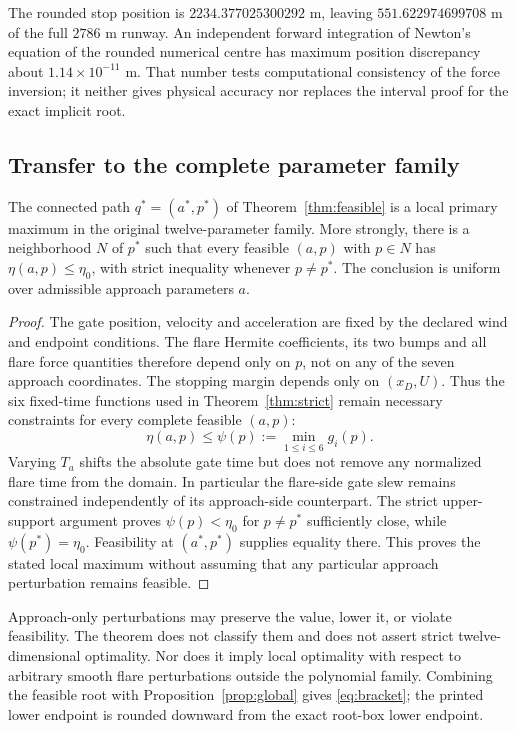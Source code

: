 The rounded stop position is $2234.377025300292$ m, leaving $551.622974699708$ m of the full $2786$ m runway. An independent forward integration of Newton's equation of the rounded numerical centre has maximum position discrepancy about $1.14\times10^{-11}$ m. That number tests computational consistency of the force inversion; it neither gives physical accuracy nor replaces the interval proof for the exact implicit root.

\subsection{Transfer to the complete parameter family}
\begin{theorem}\label{thm:transfer}
The connected path $q^*=(a^*,p^*)$ of Theorem~\ref{thm:feasible} is a local primary maximum in the original twelve-parameter family. More strongly, there is a neighborhood $N$ of $p^*$ such that every feasible $(a,p)$ with $p\in N$ has $\eta(a,p)\leq\eta_0$, with strict inequality whenever $p\ne p^*$. The conclusion is uniform over admissible approach parameters $a$.
\end{theorem}
\begin{proof}
The gate position, velocity and acceleration are fixed by the declared wind and endpoint conditions. The flare Hermite coefficients, its two bumps and all flare force quantities therefore depend only on $p$, not on any of the seven approach coordinates. The stopping margin depends only on $(x_D,U)$. Thus the six fixed-time functions used in Theorem~\ref{thm:strict} remain necessary constraints for every complete feasible $(a,p)$:
\[
 \eta(a,p)\leq\psi(p):=\min_{1\leq i\leq6}g_i(p).
\]
Varying $T_a$ shifts the absolute gate time but does not remove any normalized flare time from the domain. In particular the flare-side gate slew remains constrained independently of its approach-side counterpart. The strict upper-support argument proves $\psi(p)<\eta_0$ for $p\ne p^*$ sufficiently close, while $\psi(p^*)=\eta_0$. Feasibility at $(a^*,p^*)$ supplies equality there. This proves the stated local maximum without assuming that any particular approach perturbation remains feasible.
\end{proof}

Approach-only perturbations may preserve the value, lower it, or violate feasibility. The theorem does not classify them and does not assert strict twelve-dimensional optimality. Nor does it imply local optimality with respect to arbitrary smooth flare perturbations outside the polynomial family. Combining the feasible root with Proposition~\ref{prop:global} gives \eqref{eq:bracket}; the printed lower endpoint is rounded downward from the exact root-box lower endpoint.
